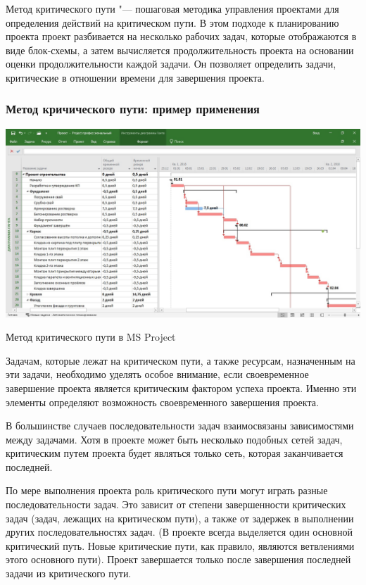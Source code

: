 \documentclass{../industrial-development}
\begin{document}
Метод критического пути "--- пошаговая методика управления проектами для определения действий на критическом пути. В этом подходе к планированию проекта проект разбивается на несколько рабочих задач, которые отображаются в виде блок-схемы, а затем вычисляется продолжительность проекта на основании оценки продолжительности каждой задачи. Он позволяет определить задачи, критические в отношении времени для завершения проекта.

    \begin{frame} \frametitle{Метод кричического пути: пример применения}
         \centerline{\includegraphics[width=1\textwidth]{critical.jpg}}
	\centerline{Метод  критического пути в MS Project}	
    \end{frame}
    \lecturenotes

Задачам, которые лежат на критическом пути, а также ресурсам, назначенным на эти задачи, необходимо уделять особое внимание, если своевременное завершение проекта является критическим фактором успеха проекта. Именно эти элементы определяют возможность своевременного завершения проекта.

В большинстве случаев последовательности задач взаимосвязаны зависимостями между задачами. Хотя в проекте может быть несколько подобных сетей задач, критическим путем проекта будет являться только сеть, которая заканчивается последней.

По мере выполнения проекта роль критического пути могут играть разные последовательности задач. Это зависит от степени завершенности критических задач (задач, лежащих на критическом пути), а также от задержек в выполнении других последовательностях задач. (В проекте всегда выделяется один основной критический путь. Новые критические пути, как правило, являются ветвлениями этого основного пути). Проект завершается только после завершения последней задачи из критического пути.
\end{document}
